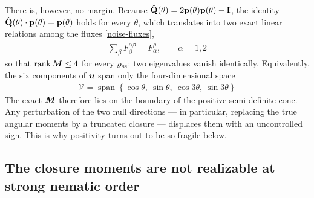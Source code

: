 \documentclass[a5paper]{article}
\begin{document}
There is, however, no margin. Because $\hat\Q(\theta) = 2\p(\theta)\p(\theta) - \I$, the identity $\hat\Q(\theta)\cdot\p(\theta) = \p(\theta)$ holds for every $\theta$, which translates into two exact linear relations among the fluxes \eqref{noise-fluxes},
\begin{align}
    \label{flux-identity}
    \sum_\beta F^{\alpha\beta}_\beta = F^\rho_\alpha, \qquad \alpha = 1,2
\end{align}
so that $\operatorname{rank} \bs M \le 4$ for every $\varrho_\ss$: two eigenvalues vanish identically. Equivalently, the six components of $\bs u$ span only the four-dimensional space
\begin{align}
    \label{u-span}
    \mathcal{V} = \operatorname{span}\left\{\cos\theta,\ \sin\theta,\ \cos 3\theta,\ \sin 3\theta\right\}
\end{align}
The exact $\bs M$ therefore lies on the boundary of the positive semi-definite cone. Any perturbation of the two null directions --- in particular, replacing the true angular moments by a truncated closure --- displaces them with an uncontrolled sign. This is why positivity turns out to be so fragile below.

\subsection{The closure moments are not realizable at strong nematic order}
\label{sec-realizability-bound}
\end{document}
